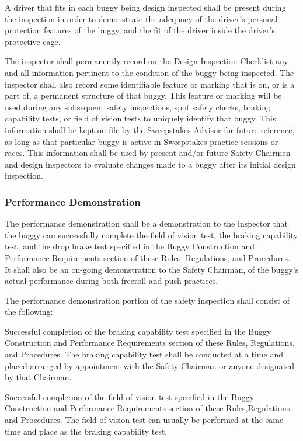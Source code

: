 	A driver that fits in each buggy being design inspected shall be present during
	the inspection in order to demonstrate the adequacy of the driver's personal
	protection features of the buggy, and the fit of the driver inside the driver's
	protective cage.

	The inspector shall permanently record on the Design Inspection Checklist any
	and all information pertinent to the condition of the buggy being inspected.
	The inspector shall also record some identifiable feature or marking that is
	on, or is a part of, a permanent structure of that buggy. This feature or
	marking will be used during any subsequent safety inspections, spot safety
	checks, braking capability tests, or field of vision tests to uniquely identify
	that buggy. This information shall be kept on file by the Sweepstakes Advisor
	for future reference, as long as that particular buggy is active in Sweepstakes
	practice sessions or races. This information shall be used by present and/or
	future Safety Chairmen and design inspectors to evaluate changes made to a
	buggy after its initial design inspection.

\subsubsection{Performance Demonstration}

	The performance demonstration shall be a demonstration to the inspector that
	the buggy can successfully complete the field of vision test, the braking
	capability test, and the drop brake test specified in the Buggy Construction
	and Performance Requirements section of these Rules, Regulations, and
	Procedures. It shall also be an on-going demonstration to the Safety Chairman,
	of the buggy's actual performance during both freeroll and push practices.

	The performance demonstration portion of the safety inspection shall consist of
	the following:

	Successful completion of the braking capability test specified in the Buggy
	Construction and Performance Requirements section of these Rules, Regulations,
	and Procedures. The braking capability test shall be conducted at a time and
	placed arranged by appointment with the Safety Chairman or anyone designated by
	that Chairman.

	Successful completion of the field of vision test specified in the Buggy
	Construction and Performance Requirements section of these Rules,Regulations,
	and Procedures. The field of vision test can usually be performed at the same
	time and place as the braking capability test.


